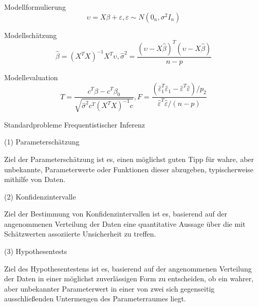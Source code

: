 \documentclass[
  8pt,
  ignorenonframetext,
]{beamer}
\begin{document}
\begin{frame}{}
\protect\hypertarget{section-3}{}
\vspace{1mm}
\normalsize

Modellformulierung \vspace{1mm} \small \begin{equation}
\upsilon = X\beta + \varepsilon, \varepsilon \sim N(0_n,\sigma^2I_n)
\end{equation} \vspace{5mm}

\normalsize

Modellschätzung \small \begin{equation}
\hat{\beta} = (X^TX)^{-1} X^T\upsilon,  \hat{\sigma}^2 = \frac{(\upsilon-X\hat{\beta})^T(\upsilon-X\hat{\beta})}{n-p}
\end{equation} \vspace{4mm}

\normalsize

Modellevaluation \small \begin{equation}
T = \frac{c^T\hat{\beta} - c^T\beta_0}{\sqrt{\hat{\sigma}^2c^T(X^TX)^{-1}c}},
F = \frac{(\hat{\varepsilon}_1^T\hat{\varepsilon}_1 - \hat{\varepsilon}^T\hat{\varepsilon})/p_2}{\hat{\varepsilon}^T\hat{\varepsilon}/(n-p)}
\end{equation}
\end{frame}

\begin{frame}{}
\protect\hypertarget{section-4}{}
Standardprobleme Frequentistischer Inferenz

\small
\vspace{2mm}

\noindent (1) Parameterschätzung

Ziel der Parameterschätzung ist es, einen möglichst guten Tipp für
wahre, aber unbekannte, Parameterwerte oder Funktionen dieser abzugeben,
typischerweise mithilfe von Daten.

\vspace{2mm}

\noindent (2) Konfidenzintervalle

Ziel der Bestimmung von Konfidenzintervallen ist es, basierend auf der
angenommenen Verteilung der Daten eine quantitative Aussage über die mit
Schätzwerten assoziierte Unsicherheit zu treffen.

\vspace{2mm}

\noindent (3) Hypothesentests

Ziel des Hypothesentestens ist es, basierend auf der angenommenen
Verteilung der Daten in einer möglichst zuverlässigen Form zu
entscheiden, ob ein wahrer, aber unbekannter Parameterwert in einer von
zwei sich gegenseitig ausschließenden Untermengen des Parameterraumes
liegt.
\end{frame}
\end{document}
